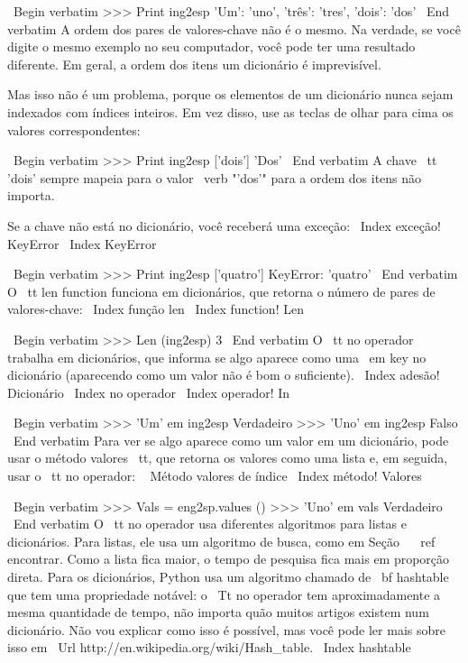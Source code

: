 \documentclass[10pt]{book}
\begin{document}
{{{{{{{\ Begin {verbatim}
>>> Print ing2esp
{'Um': 'uno', 'três': 'tres', 'dois': 'dos'}
\ End {verbatim}
%
A ordem dos pares de valores-chave não é o mesmo. Na verdade, se
você digite o mesmo exemplo no seu computador, você pode ter uma
resultado diferente. Em geral, a ordem dos itens
um dicionário é imprevisível.

Mas isso não é um problema, porque
os elementos de um dicionário nunca sejam indexados com índices inteiros.
Em vez disso, use as teclas de olhar para cima os valores correspondentes:

\ Begin {verbatim}
>>> Print ing2esp ['dois']
'Dos'
\ End {verbatim}
%
A chave {\ tt 'dois'} sempre mapeia para o valor \ verb "'dos'" para a ordem
dos itens não importa.

Se a chave não está no dicionário, você receberá uma exceção:
\ Index {exceção! KeyError}
\ Index {} KeyError

\ Begin {verbatim}
>>> Print ing2esp ['quatro']
KeyError: 'quatro'
\ End {verbatim}
%
O {\ tt len} function funciona em dicionários, que retorna o
número de pares de valores-chave:
\ Index {função len}
\ Index {function! Len}

\ Begin {verbatim}
>>> Len (ing2esp)
3
\ End {verbatim}
%
O {\ tt no} operador trabalha em dicionários, que informa se
algo aparece como uma {\ em key} no dicionário (aparecendo
como um valor não é bom o suficiente).
\ Index {adesão! Dicionário}
\ Index {} no operador
\ Index {operador! In}

\ Begin {verbatim}
>>> 'Um' em ing2esp
Verdadeiro
>>> 'Uno' em ing2esp
Falso
\ End {verbatim}
%
Para ver se algo aparece como um valor em um dicionário,
pode usar o método {valores \ tt}, que retorna os valores como
uma lista e, em seguida, usar o {\ tt no} operador:
\ {} Método valores de índice
\ Index {método! Valores}

\ Begin {verbatim}
>>> Vals = eng2sp.values ​​()
>>> 'Uno' em vals
Verdadeiro
\ End {verbatim}
%
O {\ tt no} operador usa diferentes algoritmos para listas e
dicionários. Para listas, ele usa um algoritmo de busca, como em
Seção ~ \ ref {} encontrar. Como a lista fica maior, o tempo de pesquisa fica
mais em proporção direta. Para os dicionários, Python usa um
algoritmo chamado de {\ bf hashtable} que tem uma propriedade notável: o
{\ Tt no} operador tem aproximadamente a mesma quantidade de tempo, não importa quão
muitos artigos existem num dicionário. Não vou explicar como isso é
possível, mas você pode ler mais sobre isso em
\ Url {http://en.wikipedia.org/wiki/Hash_table}.
\ Index {} hashtable

}}}}}}}
\end{document}
